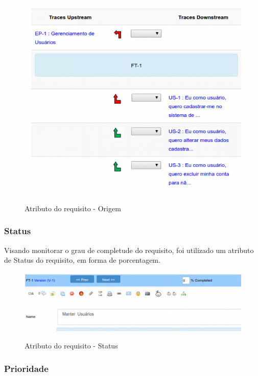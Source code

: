 \FloatBarrier
\begin{figure}[!htpd]
		\centering
		\includegraphics[scale=0.4]{figuras/origem}
		\label{img:origem}
		\caption{Atributo do requisito - Origem}
\end{figure}
\FloatBarrier

\subsubsection{Status}

Visando monitorar o grau de completude do requisito, foi utilizado um atributo de Status do requisito, em forma de porcentagem.

\FloatBarrier
\begin{figure}[!htpd]
		\centering
		\includegraphics[scale=0.4]{figuras/status}
		\label{img:status}
		\caption{Atributo do requisito - Status}
\end{figure}
\FloatBarrier

\subsubsection{Prioridade}

